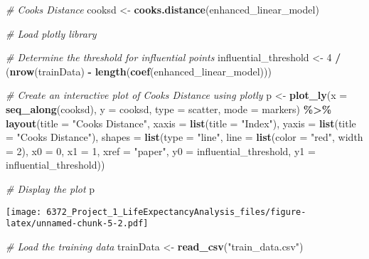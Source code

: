 \documentclass[
]{article}
\newenvironment{Shaded}{\begin{snugshade}}{\end{snugshade}}
\newcommand{\AttributeTok}[1]{\textcolor[rgb]{0.13,0.29,0.53}{#1}}
\newcommand{\CommentTok}[1]{\textcolor[rgb]{0.56,0.35,0.01}{\textit{#1}}}
\newcommand{\DecValTok}[1]{\textcolor[rgb]{0.00,0.00,0.81}{#1}}
\newcommand{\FunctionTok}[1]{\textcolor[rgb]{0.13,0.29,0.53}{\textbf{#1}}}
\newcommand{\NormalTok}[1]{#1}
\newcommand{\OtherTok}[1]{\textcolor[rgb]{0.56,0.35,0.01}{#1}}
\newcommand{\SpecialCharTok}[1]{\textcolor[rgb]{0.81,0.36,0.00}{\textbf{#1}}}
\newcommand{\StringTok}[1]{\textcolor[rgb]{0.31,0.60,0.02}{#1}}
\begin{document}
\begin{Shaded}
\begin{Highlighting}[]
\CommentTok{\# Cook\textquotesingle{}s Distance}
\NormalTok{cooksd }\OtherTok{\textless{}{-}} \FunctionTok{cooks.distance}\NormalTok{(enhanced\_linear\_model)}

\CommentTok{\# Load plotly library}

\CommentTok{\# Determine the threshold for influential points}
\NormalTok{influential\_threshold }\OtherTok{\textless{}{-}} \DecValTok{4} \SpecialCharTok{/}\NormalTok{ (}\FunctionTok{nrow}\NormalTok{(trainData) }\SpecialCharTok{{-}} \FunctionTok{length}\NormalTok{(}\FunctionTok{coef}\NormalTok{(enhanced\_linear\_model)))}

\CommentTok{\# Create an interactive plot of Cook\textquotesingle{}s Distance using plotly}
\NormalTok{p }\OtherTok{\textless{}{-}} \FunctionTok{plot\_ly}\NormalTok{(}\AttributeTok{x =} \FunctionTok{seq\_along}\NormalTok{(cooksd), }\AttributeTok{y =}\NormalTok{ cooksd, }\AttributeTok{type =} \StringTok{\textquotesingle{}scatter\textquotesingle{}}\NormalTok{, }\AttributeTok{mode =} \StringTok{\textquotesingle{}markers\textquotesingle{}}\NormalTok{) }\SpecialCharTok{\%\textgreater{}\%}
  \FunctionTok{layout}\NormalTok{(}\AttributeTok{title =} \StringTok{"Cook\textquotesingle{}s Distance"}\NormalTok{,}
         \AttributeTok{xaxis =} \FunctionTok{list}\NormalTok{(}\AttributeTok{title =} \StringTok{"Index"}\NormalTok{),}
         \AttributeTok{yaxis =} \FunctionTok{list}\NormalTok{(}\AttributeTok{title =} \StringTok{"Cook\textquotesingle{}s Distance"}\NormalTok{),}
         \AttributeTok{shapes =} \FunctionTok{list}\NormalTok{(}\AttributeTok{type =} \StringTok{"line"}\NormalTok{, }\AttributeTok{line =} \FunctionTok{list}\NormalTok{(}\AttributeTok{color =} \StringTok{"red"}\NormalTok{, }\AttributeTok{width =} \DecValTok{2}\NormalTok{), }\AttributeTok{x0 =} \DecValTok{0}\NormalTok{, }\AttributeTok{x1 =} \DecValTok{1}\NormalTok{, }\AttributeTok{xref =} \StringTok{"paper"}\NormalTok{, }\AttributeTok{y0 =}\NormalTok{ influential\_threshold, }\AttributeTok{y1 =}\NormalTok{ influential\_threshold))}

\CommentTok{\# Display the plot}
\NormalTok{p}
\end{Highlighting}
\end{Shaded}

\texttt{[image: 6372\_Project\_1\_LifeExpectancyAnalysis\_files/figure-latex/unnamed-chunk-5-2.pdf]}

\begin{Shaded}
\begin{Highlighting}[]
\CommentTok{\# Load the training data}
\NormalTok{trainData }\OtherTok{\textless{}{-}} \FunctionTok{read\_csv}\NormalTok{(}\StringTok{"train\_data.csv"}\NormalTok{)}
\end{Highlighting}
\end{Shaded}
\end{document}
